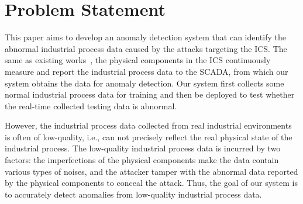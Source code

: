 \section{Problem Statement}
\label{sec:problem statement}
This paper aims to develop an anomaly detection system that can identify the abnormal industrial process data caused by the attacks targeting the ICS. The same as existing works~\cite{aoudi2018truth,zhang2023unsupervised,feng2019systematic,fungattributions,feng2021time,alsaedi2022usmd,kravchik2021efficient,erba2022assessing,tuli2022tranad,abdelaty2020aads,abdelaty2021daics}, the physical components in the ICS continuously measure and report the industrial process data to the SCADA, from which our system obtains the data for anomaly detection. Our system first collects some normal industrial process data for training and then be deployed to test whether the real-time collected testing data is abnormal. 

However, the industrial process data collected from real industrial environments is often of low-quality, i.e., can not precisely reflect the real physical state of the industrial process. The low-quality industrial process data is incurred by two factors: the imperfections of the physical components make the data contain various types of noises, and the attacker tamper with the abnormal data reported by the physical components to conceal the attack. Thus, the goal of our system is to accurately detect anomalies from low-quality industrial process data.


